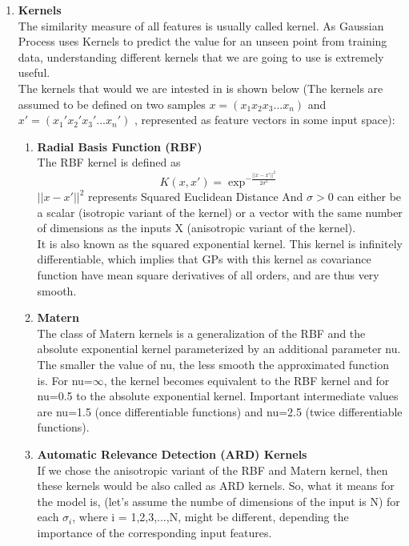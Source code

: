 \documentclass{article}
\begin{document}
\begin{enumerate}
		\item \textbf{Kernels}	\\
		The similarity measure of all features is usually called kernel. As Gaussian Process uses Kernels to predict the value for an unseen point from training data, 
		understanding different kernels that we are going to use is extremely useful. \\
		The kernels that would we are intested in is shown below 
		(The kernels are assumed to be defined on two samples \( x = ( x_{1} x_{2} x_{3} ... x_{n} ) \) and 
		\( x' = ( {x_{1}}' {x_{2}}' {x_{3}}' ... {x_{n}}')\) ,  
		represented as feature vectors in some input space):
		\begin{enumerate}
			\item \textbf{Radial Basis Function (RBF)}\\
			The RBF kernel is defined as 
			\begin{equation}\label{eq:kernel_rbf}
				K(x,x') = \exp^{-\frac{||x-x'||^{2}}{2\sigma^{2}}}
			\end{equation}
			\(||x-x'||^{2}\) represents Squared Euclidean Distance 
			And \( \sigma > 0 \) can either be a scalar (isotropic variant of the kernel) or a vector with the same number of dimensions 
			as the inputs X (anisotropic variant of the kernel). \\
			It is also known as the squared exponential kernel. This kernel is infinitely differentiable, 
			which implies that GPs with this kernel as covariance function have mean square derivatives of all orders, 
			and are thus very smooth.
			
			\item \textbf{Matern}\\
			The class of Matern kernels is a generalization of the RBF and the absolute exponential kernel parameterized 
			by an additional parameter nu. The smaller the value of nu, the less smooth the approximated function is. For nu=\(\infty\), 
			the kernel becomes equivalent to the RBF kernel and for nu=0.5 to the absolute exponential kernel. 
			Important intermediate values are nu=1.5 (once differentiable functions) and nu=2.5 (twice differentiable functions).

			\item \textbf{Automatic Relevance Detection (ARD) Kernels}\\
			If we chose the anisotropic variant of the RBF and Matern kernel, then these kernels would be also called as ARD kernels. 
			So, what it means for the model is, (let's assume the numbe of dimensions of the input is N) for each \(\sigma_{i}\), where i = 1,2,3,...,N, 
			might be different, depending the importance of the corresponding input features. \\


\end{enumerate}
\end{enumerate}
\end{document}
